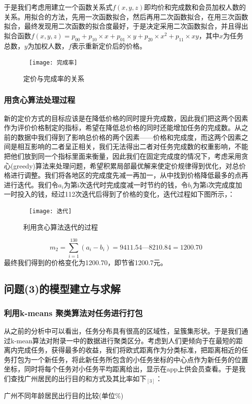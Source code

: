 \documentclass{ctexart}
\begin{document}
于是我们考虑用建立一个函数关系式$f(x,y,z)$即均价和完成数和会员加权人数的关系。用拟合的方法，先用一次函数拟合，然后再用二次函数拟合，在用三次函数拟合，最终发现用二次函数的拟合度最好，于是决定采用二次函数拟合，并且得出拟合函数$f(x,y,z)=p_{00}+p_{10}\times x+ p_{01}\times y+p_{20}\times x^2+p_{11}\times xy$，其中$x$为任务总数，$y$为加权人数，$f$表示重新定价后的价格。
\begin{figure}[htbp]  
\centering
\texttt{[image: 完成率]} 
\caption{定价与完成率的关系}
\end{figure}
\newpage
\subsubsection{用贪心算法处理过程}
新的定价方式的目标应该是在降低价格的同时提升完成数，因此我们把这两个因素作为评价价格制定的指标，希望在降低总价格的同时还能增加任务的完成数。从之前的数据中我们得到了影响总价格的两个因素——价格和完成度，而这两个因素之间是相互影响的二者呈正相关，我们无法得出二者对任务完成数的权重影响，不能把他们放到同一个指标里面来衡量，因此我们在固定完成度的情况下，考虑采用贪心(greedy)算法来处理问题，希望积累局部最优解来使定价规律得到优化，对总价格进行调整。我们将各地区的完成度先减一再加一，从中找到价格降低最多的点再进行迭代。我们令$a_i$为第i次迭代时完成度减一时节约的钱，令$b_i$为第i次完成度加一时投入的钱，经过112次迭代后得到了价格的变化，迭代过程如下图所示，：
\begin{figure}[htbp]  
\centering
\texttt{[image: 迭代]} 
\caption{利用贪心算法迭代的过程}
\end{figure}
\newpage
\begin{equation}
m_2=\sum^{130}_{i=1}(a_i-b_i)=9411.54—8210.84=1200.70
\end{equation}
最终我们得到的价格变化为1200.70，即节省1200.7元。

\subsection{问题(3)的模型建立与求解}
\subsubsection{利用k-means 聚类算法对任务进行打包}
从之前的分析中可以看出，任务分布具有很高的区域性，呈簇集形状。于是我们通过k-mean算法对附录一中的数据进行聚类区分。考虑到人们更倾向于在最短的距离内完成任务，获得最多的收益，我们将欧式距离作为分类标准，把距离相近的任务打包为一个新任务，将此新任务所包含的小任务坐标的中心点作为新任务的位置坐标，同时将每个任务对小任务平均距离给出，显示在app上供会员查看。于是我们查找广州居民的出行目的和方式及其比率如下$_{[3]}$：
\\
\centerline{广州不同年龄居民出行目的比较(单位\%)}
\end{document}
